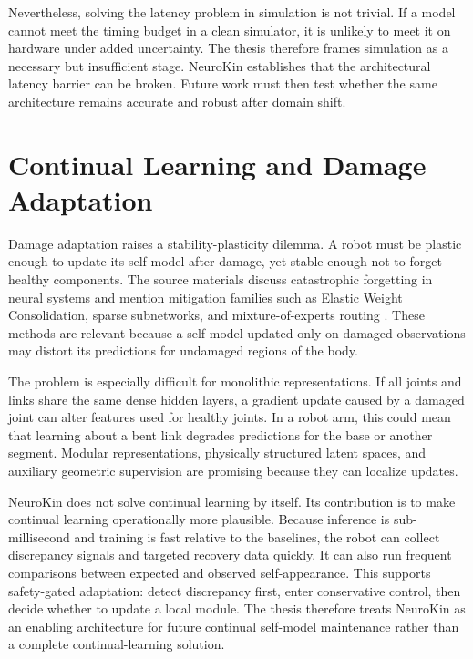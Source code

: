 \documentclass[12pt,a4paper,oneside]{report}
\begin{document}
Nevertheless, solving the latency problem in simulation is not trivial. If a model cannot meet the timing budget in a clean simulator, it is unlikely to meet it on hardware under added uncertainty. The thesis therefore frames simulation as a necessary but insufficient stage. NeuroKin establishes that the architectural latency barrier can be broken. Future work must then test whether the same architecture remains accurate and robust after domain shift.

\section{Continual Learning and Damage Adaptation}

Damage adaptation raises a stability-plasticity dilemma. A robot must be plastic enough to update its self-model after damage, yet stable enough not to forget healthy components. The source materials discuss catastrophic forgetting in neural systems and mention mitigation families such as Elastic Weight Consolidation, sparse subnetworks, and mixture-of-experts routing \cite{kirkpatrick2017overcoming,frankle2018lottery}. These methods are relevant because a self-model updated only on damaged observations may distort its predictions for undamaged regions of the body.

The problem is especially difficult for monolithic representations. If all joints and links share the same dense hidden layers, a gradient update caused by a damaged joint can alter features used for healthy joints. In a robot arm, this could mean that learning about a bent link degrades predictions for the base or another segment. Modular representations, physically structured latent spaces, and auxiliary geometric supervision are promising because they can localize updates.

NeuroKin does not solve continual learning by itself. Its contribution is to make continual learning operationally more plausible. Because inference is sub-millisecond and training is fast relative to the baselines, the robot can collect discrepancy signals and targeted recovery data quickly. It can also run frequent comparisons between expected and observed self-appearance. This supports safety-gated adaptation: detect discrepancy first, enter conservative control, then decide whether to update a local module. The thesis therefore treats NeuroKin as an enabling architecture for future continual self-model maintenance rather than a complete continual-learning solution.
\end{document}
